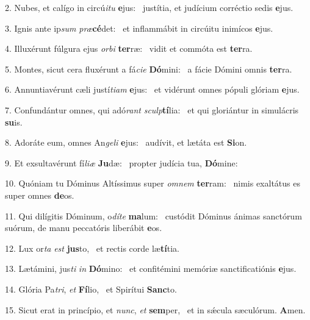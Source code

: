 2. Nubes, et calígo in circú\textit{i}\textit{tu} \textbf{e}jus: \ast\  justítia, et judícium corréctio sedis \textbf{e}jus.\

3. Ignis ante ip\textit{sum} \textit{præ}\textbf{cé}det: \ast\  et inflammábit in circúitu inimícos \textbf{e}jus.\

4. Illuxérunt fúlgura ejus \textit{or}\textit{bi} \textbf{ter}ræ: \ast\  vidit et commóta est \textbf{ter}ra.\

5. Montes, sicut cera fluxérunt a fá\textit{ci}\textit{e} \textbf{Dó}mini: \ast\  a fácie Dómini omnis \textbf{ter}ra.\

6. Annuntiavérunt cæli justí\textit{ti}\textit{am} \textbf{e}jus: \ast\  et vidérunt omnes pópuli glóriam \textbf{e}jus.\

7. Confundántur omnes, qui adó\textit{rant} \textit{sculp}\textbf{tí}lia: \ast\  et qui gloriántur in simulácris \textbf{su}is.\

8. Adoráte eum, omnes An\textit{ge}\textit{li} \textbf{e}jus: \ast\  audívit, et lætáta est \textbf{Si}on.\

9. Et exsultavérunt fí\textit{li}\textit{æ} \textbf{Ju}dæ: \ast\  propter judícia tua, \textbf{Dó}mine:\

10. Quóniam tu Dóminus Altíssimus super \textit{om}\textit{nem} \textbf{ter}ram: \ast\  nimis exaltátus es super omnes \textbf{de}os.\

11. Qui dilígitis Dóminum, o\textit{dí}\textit{te} \textbf{ma}lum: \ast\  custódit Dóminus ánimas sanctórum suórum, de manu peccatóris liberábit \textbf{e}os.\

12. Lux or\textit{ta} \textit{est} \textbf{jus}to, \ast\  et rectis corde læ\textbf{tí}tia.\

13. Lætámini, jus\textit{ti} \textit{in} \textbf{Dó}mino: \ast\  et confitémini memóriæ sanctificatiónis \textbf{e}jus.\

14. Glória Pa\textit{tri}, \textit{et} \textbf{Fí}lio, \ast\  et Spirítui \textbf{Sanc}to.\

15. Sicut erat in princípio, et \textit{nunc}, \textit{et} \textbf{sem}per, \ast\  et in sǽcula sæculórum. \textbf{A}men.\

